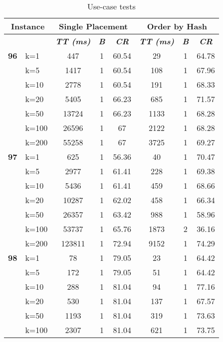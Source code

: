     \begin{table}[htbp]
    \caption{Use-case tests}
    \centering
    \begin{tabular}{|l|l|c|c|c|c|c|c|}
    
    \multicolumn{ 2}{|c|}{\textbf{Instance}} & \multicolumn{ 3}{c|}{\textbf{Single Placement}} & \multicolumn{ 3}{c|}{\textbf{Order by Hash}} \\ \hline
    \multicolumn{ 2}{|l|}{} & \textbf{\textit{TT (ms)}} & \textbf{\textit{B}} & \textbf{\textit{CR}} & \textbf{\textit{TT (ms)}} & \textbf{\textit{B}} & \textbf{\textit{CR}} \\ \hline
    \multicolumn{1}{|r|}{\textbf{96}} & k=1 & 447 & 1 & 60.54 & 29 & 1 & 64.78 \\ 
     & k=5 & 1417 & 1 & 60.54 & 108 & 1 & 67.96 \\ 
     & k=10 & 2778 & 1 & 60.54 & 191 & 1 & 68.33 \\ 
     & k=20 & 5405 & 1 & 66.23 & 685 & 1 & 71.57 \\ 
     & k=50 & 13724 & 1 & 66.23 & 1133 & 1 & 68.28 \\ 
     & k=100 & 26596 & 1 & 67 & 2122 & 1 & 68.28 \\ 
     & k=200 & 55258 & 1 & 67 & 3725 & 1 & 69.27 \\ \hline
    \multicolumn{1}{|r|}{\textbf{97}} & k=1 & 625 & 1 & 56.36 & 40 & 1 & 70.47 \\ 
     & k=5 & 2977 & 1 & 61.41 & 228 & 1 & 69.38 \\ 
     & k=10 & 5436 & 1 & 61.41 & 459 & 1 & 68.66 \\ 
     & k=20 & 10287 & 1 & 62.02 & 458 & 1 & 66.34 \\ 
     & k=50 & 26357 & 1 & 63.42 & 988 & 1 & 58.96 \\ 
     & k=100 & 53737 & 1 & 65.76 & 1873 & 2 & 36.16 \\ 
     & k=200 & 123811 & 1 & 72.94 & 9152 & 1 & 74.29 \\ \hline
    \multicolumn{1}{|r|}{\textbf{98}} & k=1 & 78 & 1 & 79.05 & 23 & 1 & 64.42 \\ 
     & k=5 & 172 & 1 & 79.05 & 51 & 1 & 64.42 \\ 
     & k=10 & 288 & 1 & 81.04 & 94 & 1 & 77.16 \\ 
     & k=20 & 530 & 1 & 81.04 & 137 & 1 & 67.57 \\ 
     & k=50 & 1193 & 1 & 81.04 & 319 & 1 & 73.63 \\ 
     & k=100 & 2307 & 1 & 81.04 & 621 & 1 & 73.75 \\ 

\end{tabular}
\end{table}
